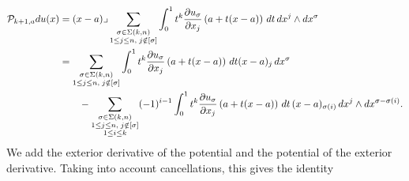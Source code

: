 \documentclass[10pt,a4paper]{article}
\begin{document}
\begin{align*}
    {\mathcal P}_{k+1,a} d u(x)
    &=
    (x-a)\lrcorner 
    \sum_{\substack{ \sigma \in \Sigma(k,n) \\ 1 \leq j \leq n, \; j \notin [\sigma] }}
    \int_{0}^{1} t^{k} \frac{ \partial u_{\sigma} }{\partial x_{j}}\left(a+t(x-a)\right) \,dt 
    \,dx^{j} \wedge dx^{\sigma}
    \\&
    = 
    \sum_{\substack{ \sigma \in \Sigma(k,n) \\ 1 \leq j \leq n, \; j \notin [\sigma] }} 
    \int_{0}^{1} t^{k} \frac{ \partial u_{\sigma} }{\partial x_{j}}\left(a+t(x-a)\right) \,dt (x-a)_{j}
    \,dx^{\sigma} 
    \\&\qquad 
    - 
    \sum_{\substack{ \sigma \in \Sigma(k,n) \\ 1 \leq j \leq n, \; j \notin [\sigma] \\ 1 \leq i \leq k }}
    (-1)^{i-1}
    \int_{0}^{1} t^{k} \frac{ \partial u_{\sigma} }{\partial x_{j}}\left(a+t(x-a)\right) \,dt 
    \,(x-a)_{\sigma(i)} 
    \,dx^{j} \wedge dx^{\sigma-\sigma(i)}
    .
\end{align*}
We add the exterior derivative of the potential and the potential of the exterior derivative.
Taking into account cancellations, this gives the identity 
\end{document}
